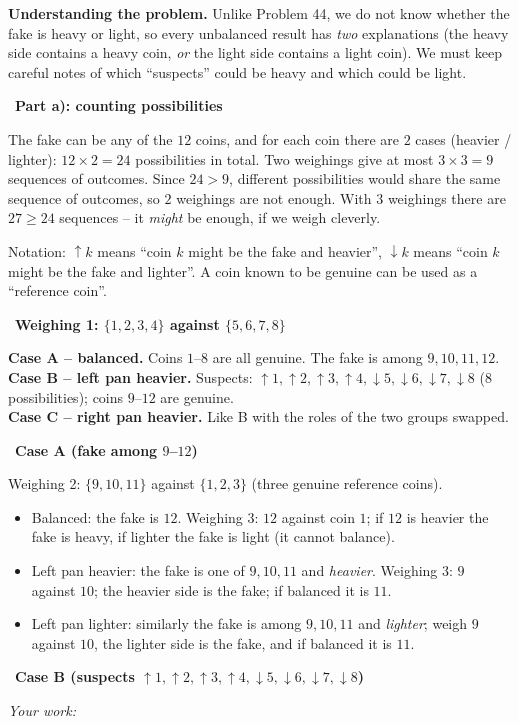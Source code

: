 \documentclass[11pt]{article}
\newif\ifsol \solfalse
\newcommand{\StuProb}[2]{\begin{probboxS}{#1}{#2}\StuProbBody\end{probboxS}}
\newcommand{\probsol}[1]{%
  \begin{lrbox}{\solmeasure}\begin{minipage}{\dimexpr\linewidth-24pt\relax}#1\end{minipage}\end{lrbox}%
  \ifsol
    \begin{solbox}#1\end{solbox}%
  \else
    \setlength{\solht}{\dimexpr\ht\solmeasure+\dp\solmeasure+0.85cm\relax}%
    \ifdim\solht<1.35cm\setlength{\solht}{1.35cm}\fi
    \ifdim\solht>\StudentMaxWork\setlength{\solht}{\StudentMaxWork}\fi
    \par\noindent\begin{minipage}{\linewidth}%
    \expandafter\StuProb\StuProbArgs
    \begin{tcolorbox}[colback=white,colframe=Line,boxrule=0.8pt,arc=5pt,
      left=8pt,right=8pt,top=4pt,bottom=4pt,height=\solht]{\footnotesize\color{Slate}\itshape\WorkWord}\end{tcolorbox}%
    \end{minipage}\par\medskip
  \fi}
\newlength{\StudentMaxWork}\setlength{\StudentMaxWork}{4.5cm}
\newcommand{\step}[2]{\par\smallskip\noindent{\bfseries\color{tmBlue!85!black}\StepWord~#1.}\ {\bfseries #2}\par\nopagebreak}
\def\WorkWord{Your work:}
\def\StepWord{Step}
\begin{document}
\probsol{
\textbf{Understanding the problem.} Unlike Problem 44, we do not know whether the fake is heavy or light, so every unbalanced result has
\emph{two} explanations (the heavy side contains a heavy coin, \emph{or} the light side contains a light coin). We must keep careful
notes of which ``suspects'' could be heavy and which could be light.
\step{1}{Part a): counting possibilities}
The fake can be any of the $12$ coins, and for each coin there are $2$ cases (heavier / lighter): $12\times 2 = 24$ possibilities in
total. Two weighings give at most $3\times 3 = 9$ sequences of outcomes. Since $24 > 9$, different possibilities would share the same
sequence of outcomes, so $2$ weighings are not enough. With $3$ weighings there are $27 \ge 24$ sequences -- it \emph{might} be enough,
if we weigh cleverly.
\begin{recallbox}Notation: $\uparrow k$ means ``coin $k$ might be the fake and heavier'', $\downarrow k$ means ``coin $k$ might be the
fake and lighter''. A coin known to be genuine can be used as a ``reference coin''.\end{recallbox}
\step{2}{Weighing 1: $\{1, 2, 3, 4\}$ against $\{5, 6, 7, 8\}$}
\textbf{Case A -- balanced.} Coins $1$--$8$ are all genuine. The fake is among $9, 10, 11, 12$.\\
\textbf{Case B -- left pan heavier.} Suspects: $\uparrow 1, \uparrow 2, \uparrow 3, \uparrow 4, \downarrow 5, \downarrow 6,
\downarrow 7, \downarrow 8$ ($8$ possibilities); coins $9$--$12$ are genuine.\\
\textbf{Case C -- right pan heavier.} Like B with the roles of the two groups swapped.
\step{3}{Case A (fake among $9$--$12$)}
Weighing 2: $\{9, 10, 11\}$ against $\{1, 2, 3\}$ (three genuine reference coins).
\begin{itemize}[leftmargin=1.4em,itemsep=0pt,topsep=1pt]
  \item Balanced: the fake is $12$. Weighing 3: $12$ against coin $1$; if $12$ is heavier the fake is heavy, if lighter the fake is
  light (it cannot balance).
  \item Left pan heavier: the fake is one of $9, 10, 11$ and \emph{heavier}. Weighing 3: $9$ against $10$; the heavier side is the
  fake; if balanced it is $11$.
  \item Left pan lighter: similarly the fake is among $9, 10, 11$ and \emph{lighter}; weigh $9$ against $10$, the lighter side is the
  fake, and if balanced it is $11$.
\end{itemize}
\step{4}{Case B (suspects $\uparrow 1, \uparrow 2, \uparrow 3, \uparrow 4, \downarrow 5, \downarrow 6, \downarrow 7, \downarrow 8$)}
}
\end{document}
